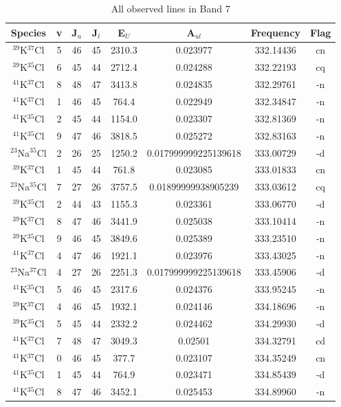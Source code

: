 \begin{table*}[htp]
\centering
\caption{All observed lines in Band 7}
\begin{tabular}{cccccccc}
\label{tab:all_detections_B7}
Species & v & J$_u$ & J$_l$ & E$_U$ & A$_{ul}$ & Frequency & Flag \\
\hline
$^{39}$K$^{37}$Cl & 5 & 46 & 45 & 2310.3 & 0.023977 & 332.14436 & cn \\
$^{39}$K$^{35}$Cl & 6 & 45 & 44 & 2712.4 & 0.024288 & 332.22193 & cq \\
$^{41}$K$^{37}$Cl & 8 & 48 & 47 & 3413.8 & 0.024835 & 332.29761 & -n \\
$^{41}$K$^{37}$Cl & 1 & 46 & 45 & 764.4 & 0.022949 & 332.34847 & -n \\
$^{41}$K$^{35}$Cl & 2 & 45 & 44 & 1154.0 & 0.023307 & 332.81369 & -n \\
$^{41}$K$^{35}$Cl & 9 & 47 & 46 & 3818.5 & 0.025272 & 332.83163 & -n \\
$^{23}$Na$^{35}$Cl & 2 & 26 & 25 & 1250.2 & 0.017999999225139618 & 333.00729 & -d \\
$^{39}$K$^{37}$Cl & 1 & 45 & 44 & 761.8 & 0.023085 & 333.01833 & cn \\
$^{23}$Na$^{35}$Cl & 7 & 27 & 26 & 3757.5 & 0.01899999938905239 & 333.03612 & cq \\
$^{39}$K$^{35}$Cl & 2 & 44 & 43 & 1155.3 & 0.023361 & 333.06770 & -d \\
$^{39}$K$^{37}$Cl & 8 & 47 & 46 & 3441.9 & 0.025038 & 333.10414 & -n \\
$^{39}$K$^{35}$Cl & 9 & 46 & 45 & 3849.6 & 0.025389 & 333.23510 & -n \\
$^{41}$K$^{37}$Cl & 4 & 47 & 46 & 1921.1 & 0.023976 & 333.43025 & -n \\
$^{23}$Na$^{37}$Cl & 4 & 27 & 26 & 2251.3 & 0.017999999225139618 & 333.45906 & -d \\
$^{41}$K$^{35}$Cl & 5 & 46 & 45 & 2317.6 & 0.024376 & 333.95245 & -n \\
$^{39}$K$^{37}$Cl & 4 & 46 & 45 & 1932.1 & 0.024146 & 334.18696 & -n \\
$^{39}$K$^{35}$Cl & 5 & 45 & 44 & 2332.2 & 0.024462 & 334.29930 & -d \\
$^{41}$K$^{37}$Cl & 7 & 48 & 47 & 3049.3 & 0.02501 & 334.32791 & cd \\
$^{41}$K$^{37}$Cl & 0 & 46 & 45 & 377.7 & 0.023107 & 334.35249 & cn \\
$^{41}$K$^{35}$Cl & 1 & 45 & 44 & 764.9 & 0.023471 & 334.85439 & -d \\
$^{41}$K$^{35}$Cl & 8 & 47 & 46 & 3452.1 & 0.025453 & 334.89960 & -n \\

\end{tabular}
\end{table*}
